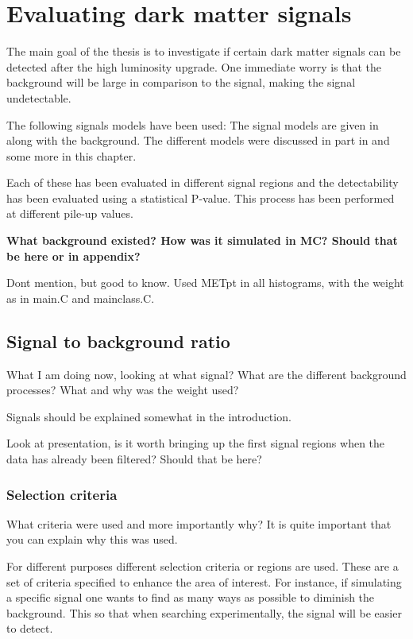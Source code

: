 \chapter{Evaluating dark matter signals}
The main goal of the thesis is to investigate if certain dark matter signals can be detected after the high luminosity upgrade. One immediate worry is that the background will be large in comparison to the signal, making the signal undetectable. 

The following signals models have been used:
The signal models are given in  along with the background. The different models were discussed in part in  and some more in this chapter.

Each of these has been evaluated in different signal regions and the detectability has been evaluated using a statistical P-value. This process has been performed at different pile-up values. 

\textbf{What background existed? How was it simulated in MC? Should that be here or in appendix?}


Dont mention, but good to know. Used METpt in all histograms, with the weight as in main.C and mainclass.C. 


\section{Signal to background ratio}
What I am doing now, looking at what signal? What are the different background processes? What and why was the weight used?

Signals should be explained somewhat in the introduction.



Look at presentation, is it worth bringing up the first signal regions when the data has already been filtered? Should that be here?
 
\subsection{Selection criteria}
What criteria were used and more importantly why? It is quite important that you can explain why this was used.

For different purposes different selection criteria or regions are used. These are a set of criteria specified to enhance the area of interest. For instance, if simulating a specific signal one wants to find as many ways as possible to diminish the background. This so that when searching experimentally, the signal will be easier to detect.

